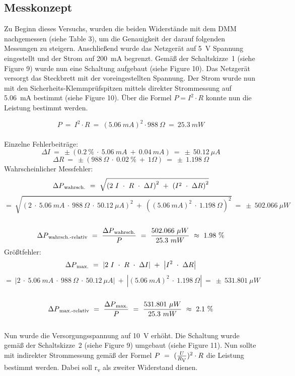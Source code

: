 \documentclass[a4paper,12pt]{article}
\begin{document}
\subsection{Messkonzept}
Zu Beginn dieses Versuchs, wurden die beiden Widerstände mit dem DMM nachgemessen (siehe Table 3), um die Genauigkeit der darauf folgenden Messungen zu steigern. Anschließend wurde das Netzgerät auf 5~V Spannung eingestellt und der Strom auf 200~mA begrenzt. Gemäß der Schaltskizze~1 (siehe Figure 9) wurde nun eine Schaltung aufgebaut (siehe Figure 10). Das Netzgerät versorgt das Steckbrett mit der voreingestellten Spannung. Der Strom wurde nun mit den Sicherheits-Klemmprüfspitzen mittels direkter Strommessung auf 5.06~mA bestimmt (siehe Figure 10). Über die Formel \(P = I^2 \cdot R \) konnte nun die Leistung bestimmt werden.

\[
P ~=~ I^2 \cdot R ~=~ (5.06~mA)^2 \cdot 988~\Omega ~=~ 25.3~mW
\]\\
Einzelne Fehlerbeiträge:
\[
\Delta I~=~\pm(0.2~\%~\cdot~5.06~mA~+~0.04~mA)~=~\pm~50.12~\mu A
\]
\[
\Delta R~=~\pm(988~\Omega~\cdot~0.02~\%~+~1\Omega)~=~\pm~1.198~\Omega
\]
Wahrscheinlicher Messfehler:\\
\[
\Delta P\textsubscript{wahrsch.}~=~\sqrt{\left(2~I~\cdot~R~\cdot~\Delta I\right)^2~+~\left(I^2~\cdot~\Delta R\right)^2}
\]
\[
=~\sqrt{\left(2~\cdot~5.06~mA~\cdot~988~\Omega~\cdot~50.12~\mu A\right)^2~+~\left((5.06~mA)^2~\cdot~1.198~\Omega\right)^2}~=~\pm~502.066~\mu W
\]\\
\[
\Delta P\textsubscript{wahrsch.-relativ}~=~\frac{\Delta P\textsubscript{wahrsch.}}{P}~=~\frac{502.066~\mu W}{25.3~mW}~\approx~1.98~\%
\]
Größtfehler:\\
\[
\Delta P\textsubscript{max.}~=~\left\lvert 2~I~\cdot~R~\cdot~\Delta I\right\rvert~+~\left\lvert I^2~\cdot~\Delta R\right\rvert
\]
\[
=~\left\lvert 2~\cdot~5.06~mA~\cdot~988~\Omega~\cdot~50.12~\mu A\right\rvert~+~\left\lvert (5.06~mA)^2~\cdot~1.198~\Omega\right\rvert~=~\pm~531.801~\mu W
\]\\
\[
\Delta P\textsubscript{max.-relativ}~=~\frac{\Delta P\textsubscript{max.}}{P}~=~\frac{531.801~\mu W}{25.3~mW}~\approx~2.1~\%
\]\\


\noindent Nun wurde die Versorgungsspannung auf 10~V erhöht. Die Schaltung wurde gemäß der Schaltskizze~2 (siehe Figure 9) umgebaut (siehe Figure 11). Nun sollte mit indirekter Strommessung gemäß der Formel \(P ~=~  (\frac{U}{R\textsubscript{V}})^2 \cdot R\) die Leistung bestimmt werden. Dabei soll r\textsubscript{v} als zweiter Widerstand dienen.
\end{document}
